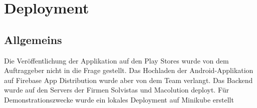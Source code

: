 \section{Deployment}

\subsection{Allgemeins}

Die Veröffentlichung der Applikation auf den Play Stores wurde von dem Auftraggeber nicht in die Frage gestellt.
Das Hochladen der Android-Applikation auf Firebase App Distribution wurde aber von dem Team verlangt.
Das Backend wurde auf den Servers der Firmen Solvistas und Macolution deployt. Für Demonstrationszwecke wurde ein lokales Deployment auf Minikube erstellt







